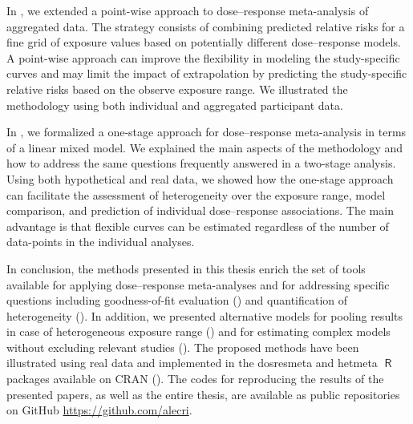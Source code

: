 \documentclass[11pt,a4paper,twoside,openany]{book}\usepackage{knitr}
\makeatletter
\def\cleardoublepage{\clearpage\if@twoside
\ifodd\c@page
\else\hbox{}\thispagestyle{empty}\newpage
\if@twocolumn\hbox{}\newpage\fi\fi\fi}
\newcommand{\pkg}[1]{{\fontseries{b}\selectfont #1}}
\DeclareMathOperator{\R}{\textsf{R}}
\makeatother
\begin{document}
{In , we extended a point-wise approach to dose--response meta-analysis of aggregated data. The strategy consists of combining predicted relative risks for a fine grid of exposure values based on potentially different dose--response models. A point-wise approach can improve the flexibility in modeling the study-specific curves and may limit the impact of extrapolation by predicting the study-specific relative risks based on the observe exposure range. We illustrated the methodology using both individual and aggregated participant data.

In , we formalized a one-stage approach for dose--response meta-analysis in terms of a linear mixed model. We explained the main aspects of the methodology and how to address the same questions frequently answered in a two-stage analysis. Using both hypothetical and real data, we showed how the one-stage approach can facilitate the assessment of heterogeneity over the exposure range, model comparison, and prediction of individual dose--response associations. The main advantage is that flexible curves can be estimated regardless of the number of data-points in the individual analyses.

In conclusion, the methods presented in this thesis enrich the set of tools available for applying dose--response meta-analyses and for addressing specific questions including goodness-of-fit evaluation () and quantification of heterogeneity (). In addition, we presented alternative models for pooling results in case of heterogeneous exposure range () and for estimating complex models without excluding relevant studies (). The proposed methods have been illustrated using real data and implemented in the \pkg{dosresmeta} and \pkg{hetmeta} $\R$ packages available on CRAN (). The codes for reproducing the results of the presented papers, as well as the entire thesis, are available as public repositories on GitHub \url{https://github.com/alecri}.


\normalsize
\cleardoublepage

%

}
\end{document}
